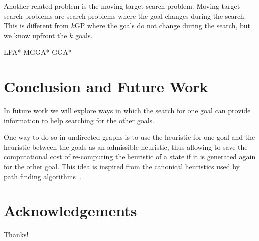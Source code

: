 \documentclass{aicom2e}
\newcommand{\kgs}{$k$GP}
\begin{document}
Another related problem is the moving-target search problem. Moving-target search problems are search problems where the goal changes during the search. This is different from \kgs{} where the goals do not change during the search, but we know upfront the $k$ goals.



LPA*
MGGA*
GGA*

\section{Conclusion and Future Work}



In future work we will explore ways in which the search for one goal
can provide information to help searching for the other goals.

One way to do so in undirected graphs is to use the heuristic for one goal and the
heuristic between the goals as an admissible heuristic, thus allowing to save the computational cost of re-computing the heuristic of a state if it is generated again for the other goal. This idea is inspired from the canonical heuristics used by path finding algorithms~\cite{canonical}.




\section*{Acknowledgements}
Thanks!



\end{document}
